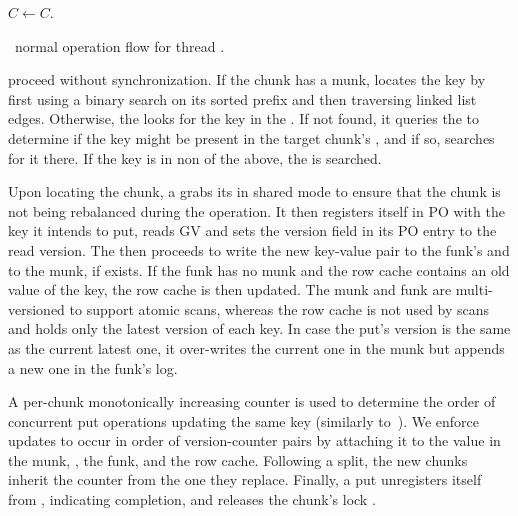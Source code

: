 \begin{algorithm}[tb]
\begin{algorithmic}[1]{}
			\State $C \leftarrow C$. 
\EndProcedure	
\end{algorithmic}
\caption{\sys\ normal operation flow for thread .}
\label{alg:ops}
\end{algorithm}


 proceed without synchronization. If the chunk has a munk,  locates the key by first using a binary search on its sorted prefix and then traversing linked list edges. 
Otherwise, the  looks for the key in the . If not found, it queries 
the  to determine if the key might be present in the target chunk's  
 , and if so, searches for it there.  If the key is in non of the above, the  is searched.


Upon locating the chunk,  a  grabs its  in shared mode to ensure that the chunk is not being rebalanced during the  operation. It then registers itself in PO with the key it intends to put,
reads GV and sets the version field in its PO entry to the read version. 
The  then proceeds to write the new key-value pair to the  funk's  and to the 
munk, if exists. 
If the funk has no munk and the row cache contains an old value of the key, the row cache is then updated.
The munk and funk are multi-versioned to support atomic scans, 
whereas the row cache is not used by scans and holds only the latest version of each key. 
In case the put's version is the same as the current latest one, it over-writes the current one in the munk
but appends a new one in the funk's log. 

A per-chunk monotonically increasing counter is used to determine 
the order of concurrent put operations updating the same key (similarly to~\cite{kiwi}).
We  enforce updates to occur in order of version-counter pairs by attaching it to the value in the munk, 
, the funk, and the row cache.
Following a split, the new chunks inherit the counter from the one they replace.  
Finally, a put unregisters itself from , indicating completion, 
and releases the chunk's lock .

